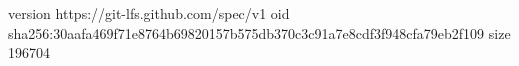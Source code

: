 version https://git-lfs.github.com/spec/v1
oid sha256:30aafa469f71e8764b69820157b575db370c3c91a7e8cdf3f948cfa79eb2f109
size 196704
